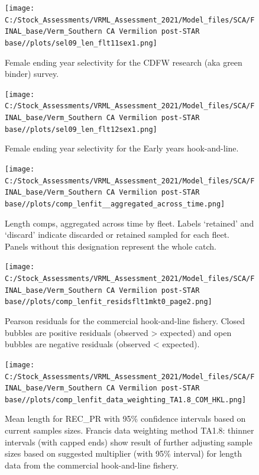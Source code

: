 \documentclass[
  english,
  a4paper,
]{article}
\begin{document}
\begin{figure}
\centering
\texttt{[image: C:/Stock\_Assessments/VRML\_Assessment\_2021/Model\_files/SCA/FINAL\_base/Verm\_Southern CA Vermilion post-STAR base//plots/sel09\_len\_flt11sex1.png]}
\caption{Female ending year selectivity for the CDFW research (aka green binder) survey.\label{fig:endyr-selex-CDFW-RESEARCH}}
\end{figure}

\begin{figure}
\centering
\texttt{[image: C:/Stock\_Assessments/VRML\_Assessment\_2021/Model\_files/SCA/FINAL\_base/Verm\_Southern CA Vermilion post-STAR base//plots/sel09\_len\_flt12sex1.png]}
\caption{Female ending year selectivity for the Early years hook-and-line.\label{fig:endyr-selex-EARLY-HKL}}
\end{figure}

\FloatBarrier

\FloatBarrier

\begin{figure}
\centering
\texttt{[image: C:/Stock\_Assessments/VRML\_Assessment\_2021/Model\_files/SCA/FINAL\_base/Verm\_Southern CA Vermilion post-STAR base//plots/comp\_lenfit\_\_aggregated\_across\_time.png]}
\caption{Length comps, aggregated across time by fleet.
Labels `retained' and `discard' indicate discarded or retained sampled for each fleet. Panels without this designation represent the whole catch.\label{fig:lenfits-all}}
\end{figure}

\FloatBarrier

\begin{figure}
\centering
\texttt{[image: C:/Stock\_Assessments/VRML\_Assessment\_2021/Model\_files/SCA/FINAL\_base/Verm\_Southern CA Vermilion post-STAR base//plots/comp\_lenfit\_residsflt1mkt0\_page2.png]}
\caption{Pearson residuals for the commercial hook-and-line fishery. Closed bubbles are positive residuals (observed \textgreater{} expected) and open bubbles are negative residuals (observed \textless{} expected).\label{fig:len-pearson-COM-HKL}}
\end{figure}

\begin{figure}
\centering
\texttt{[image: C:/Stock\_Assessments/VRML\_Assessment\_2021/Model\_files/SCA/FINAL\_base/Verm\_Southern CA Vermilion post-STAR base//plots/comp\_lenfit\_data\_weighting\_TA1.8\_COM\_HKL.png]}
\caption{Mean length for REC\_PR with 95\% confidence intervals based on current samples sizes. Francis data weighting method TA1.8: thinner intervals (with capped ends) show result of further adjusting sample sizes based on suggested multiplier (with 95\% interval) for length data from the commercial hook-and-line fishery.\label{fig:mean-len-fit-COM-HKL}}
\end{figure}
\end{document}
